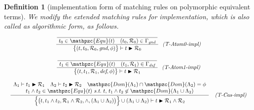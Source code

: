 \documentclass[12pt]{article}
\newtheorem{Definition}{Definition}[section]
\begin{document}
\pagebreak
\begin{Definition}[implementation form of matching rules on
    polymorphic equivalent terms]
  We modify the extended matching rules for implementation, which
  is also called as algorithmic form, as follows.
  \begin{displaymath}
    \begin{array}{c}
      
      \begin{array}{rl}
        \dfrac{
          \dfrac{}{
            \raisebox{0.5ex}[2.3ex][0ex]{
              $t_0 \in \mathpzc{Equ}(t)
               \quad (t_0, \mathcal{R}_0) \in \Gamma_\text{\it gnd}$
            }
          }
        }{
          \bigl\{(t, t_0, \mathcal{R}_0, \text{\it gnd}, \phi ) \bigr\}
           \vdash t \blacktriangleright \mathcal{R}_0
        }  &  \!\! \text{\it (T-Atom0-impl)}
      \end{array}  \\
      \\
      
      \begin{array}{rl}
        \dfrac{
          \dfrac{}{
            \raisebox{0.5ex}[2.3ex][0ex]{
              $t_1 \in \mathpzc{Equ}(t)
                \quad (t_1, \mathcal{R}_1) \in \Gamma_\text{\it def}$
            }
          }
        }{
          \bigl\{(t, t_1, \mathcal{R}_1, \text{\it def}, \phi ) \bigr\}
           \vdash t \blacktriangleright \mathcal{R}_1
        }  &  \!\! \text{\it (T-Atom1-impl)}
      \end{array}  \\
      \\
      
      \begin{array}{rl}
        \dfrac{
          \begin{array}{c}
            \Lambda_1 \vdash t_1 \blacktriangleright \mathcal{R}_1
             \quad \Lambda_2 \vdash t_2 \blacktriangleright \mathcal{R}_2
              \quad \mathpzc{Dom}(\Lambda_1) \cap \mathpzc{Dom}(\Lambda_2)
               = \phi  \\
            t_1 \wedge t_2 \in \mathpzc{Equ}(t)\
             \text{\it s.t.}\ t,\, t_1 \wedge t_2 \not\in \mathpzc{Dom}(
              \Lambda_1 \cup \Lambda_2)
          \end{array}
        }{
          \Bigl\{\bigl(t, t_1 \wedge t_2,
           \mathcal{R}_1 \wedge \mathcal{R}_2, \wedge,
            (\Lambda_1 \cup \Lambda_2) \bigr) \Bigr\}
             \cup (\Lambda_1 \cup \Lambda_2) \vdash
              t \blacktriangleright \mathcal{R}_1 \wedge \mathcal{R}_2
        }  &  \text{\it (T-Cas-impl)}
      \end{array}  \\
      \\
      

\end{array}
\end{displaymath}
\end{Definition}
\end{document}

